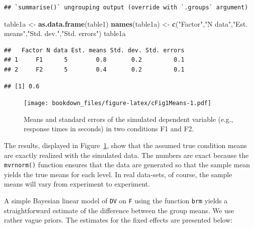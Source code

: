 \documentclass[12pt,]{krantz}
\newenvironment{Shaded}{\begin{snugshade}}{\end{snugshade}}
\newcommand{\CommentTok}[1]{\textcolor[rgb]{0.56,0.35,0.01}{\textit{#1}}}
\newcommand{\KeywordTok}[1]{\textcolor[rgb]{0.13,0.29,0.53}{\textbf{#1}}}
\newcommand{\NormalTok}[1]{#1}
\newcommand{\OperatorTok}[1]{\textcolor[rgb]{0.81,0.36,0.00}{\textbf{#1}}}
\newcommand{\StringTok}[1]{\textcolor[rgb]{0.31,0.60,0.02}{#1}}
\theoremstyle{definition}
\theoremstyle{definition}
\theoremstyle{definition}
\theoremstyle{remark}
\begin{document}
\begin{verbatim}
## `summarise()` ungrouping output (override with `.groups` argument)
\end{verbatim}

\begin{Shaded}
\begin{Highlighting}[]
\NormalTok{table1a <-}\StringTok{ }\KeywordTok{as.data.frame}\NormalTok{(table1)}
\KeywordTok{names}\NormalTok{(table1a) <-}\StringTok{ }\KeywordTok{c}\NormalTok{(}\StringTok{"Factor"}\NormalTok{,}\StringTok{"N data"}\NormalTok{,}\StringTok{"Est. means"}\NormalTok{,}\StringTok{"Std. dev."}\NormalTok{,}\StringTok{"Std. errors"}\NormalTok{)}
\NormalTok{table1a}
\end{Highlighting}
\end{Shaded}

\begin{verbatim}
##   Factor N data Est. means Std. dev. Std. errors
## 1     F1      5        0.8       0.2         0.1
## 2     F2      5        0.4       0.2         0.1
\end{verbatim}

\begin{Shaded}
\end{Shaded}

\begin{verbatim}
## [1] 0.6
\end{verbatim}

\begin{figure}
\centering
\texttt{[image: bookdown\_files/figure-latex/cFig1Means-1.pdf]}
\caption{\label{fig:cFig1Means}Means and standard errors of the simulated dependent variable (e.g., response times in seconds) in two conditions F1 and F2.}
\end{figure}

The results, displayed in Figure~\ref{fig:cFig1Means}, show that the assumed true condition means are exactly realized with the simulated data. The numbers are exact because the \texttt{mvrnorm()} function ensures that the data are generated so that the sample mean yields the true means for each level. In real data-sets, of course, the sample means will vary from experiment to experiment.

A simple Bayesian linear model of \texttt{DV} on \texttt{F} using the function \texttt{brm} yields a straightforward estimate of the difference between the group means. We use rather vague priors. The estimates for the fixed effects are presented below:
\end{document}
